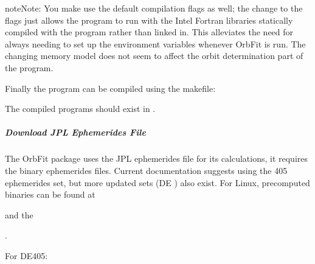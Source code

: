 \documentclass[letterpaper,11pt,english]{sphinxmanual}
\begin{document}
\begin{sphinxadmonition}{note}{Note:}
\sphinxAtStartPar
You make use the default compilation flags as well; the change to the
flags just allows the program to run with the Intel Fortran libraries
statically compiled with the program rather than linked in. This alleviates
the need for always needing to set up the environment variables whenever
OrbFit is run. The changing memory model does not seem to affect the orbit
determination part of the program.
\end{sphinxadmonition}

\sphinxAtStartPar
Finally the program can be compiled using the makefile:

\begin{sphinxVerbatim}[commandchars=\\\{\}]
\end{sphinxVerbatim}

\sphinxAtStartPar
The compiled programs should exist in .


\subparagraph{Download JPL Ephemerides File}
\label{\detokenize{technical/installation/orbfit:download-jpl-ephemerides-file}}
\sphinxAtStartPar
The OrbFit package uses the JPL ephemerides file for its calculations, it
requires the binary ephemerides files. Current documentation suggests using
the 405 ephemerides set, but more updated sets (DE ) also exist. For Linux,
precomputed binaries can be found at %
\begin{footnote}[40]\sphinxAtStartFootnote
{}
%
\end{footnote}
and the %
\begin{footnote}[41]\sphinxAtStartFootnote
{}
%
\end{footnote}.

\sphinxAtStartPar
For DE405:

\begin{sphinxVerbatim}[commandchars=\\\{\}]
  
\end{sphinxVerbatim}
\end{document}
